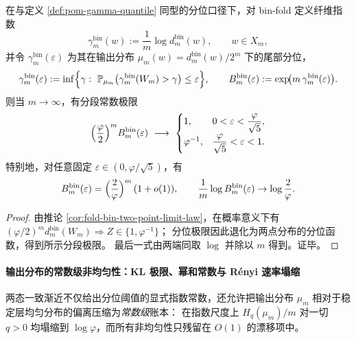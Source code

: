 \begin{corollary}\label{cor:fold-bin-quantile-threshold-constant}
在与定义 \ref{def:pom-gamma-quantile} 同型的分位口径下，对 bin-fold 定义纤维指数
\[
\gamma^{\mathrm{bin}}_m(w):=\frac{1}{m}\log d^{\mathrm{bin}}_m(w),\qquad w\in X_m,
\]
并令 \(\gamma^{\mathrm{bin}}_m(\varepsilon)\) 为其在输出分布 \(\mu_m(w)=d^{\mathrm{bin}}_m(w)/2^m\) 下的尾部分位，
\[
\gamma^{\mathrm{bin}}_{m}(\varepsilon):=\inf\Bigl\{\gamma:\ \mathbb{P}_{\mu_m}\bigl(\gamma^{\mathrm{bin}}_m(W_m)>\gamma\bigr)\le \varepsilon\Bigr\},
\qquad
B^{\mathrm{bin}}_m(\varepsilon):=\exp\!\bigl(m\,\gamma^{\mathrm{bin}}_m(\varepsilon)\bigr).
\]
则当 \(m\to\infty\)，有分段常数极限
\[
\Bigl(\frac{\varphi}{2}\Bigr)^m B^{\mathrm{bin}}_m(\varepsilon)\ \longrightarrow\
\begin{cases}
1,& 0<\varepsilon<\displaystyle\frac{\varphi}{\sqrt5},\\[6pt]
\varphi^{-1},& \displaystyle\frac{\varphi}{\sqrt5}<\varepsilon<1.
\end{cases}
\]
特别地，对任意固定 \(\varepsilon\in(0,\varphi/\sqrt5)\)，有
\[
B^{\mathrm{bin}}_m(\varepsilon)
=\Bigl(\frac{2}{\varphi}\Bigr)^m\,(1+o(1)),
\qquad
\frac{1}{m}\log B^{\mathrm{bin}}_m(\varepsilon)\to \log\frac{2}{\varphi}.
\]
\end{corollary}

\begin{proof}
由推论 \ref{cor:fold-bin-two-point-limit-law}，在概率意义下有
\(
(\varphi/2)^m d^{\mathrm{bin}}_m(W_m)\Rightarrow Z\in\{1,\varphi^{-1}\}
\)；
分位极限因此退化为两点分布的分位函数，得到所示分段极限。
最后一式由两端同取 \(\log\) 并除以 \(m\) 得到。证毕。
\end{proof}

\paragraph{输出分布的常数级非均匀性：KL 极限、幂和常数与 R\'enyi 速率塌缩}
两态一致渐近不仅给出分位阈值的显式指数常数，还允许把输出分布 \(\mu_m\) 相对于稳定层均匀分布的偏离压缩为\emph{常数级}账本：
在指数尺度上 \(H_q(\mu_m)/m\) 对一切 \(q>0\) 均塌缩到 \(\log\varphi\)，而所有非均匀性只残留在 \(O(1)\) 的漂移项中。

